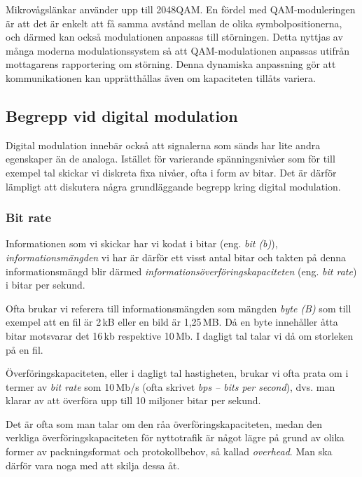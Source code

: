 Mikrovågslänkar använder upp till 2048QAM. En fördel med
QAM-moduleringen är att det är enkelt att få samma avstånd mellan de
olika symbolpositionerna, och därmed kan också modulationen anpassas
till störningen. Detta nyttjas av många moderna modulationssystem så
att QAM-modulationen anpassas utifrån mottagarens rapportering om
störning.  Denna dynamiska anpassning gör att kommunikationen kan
upprätthållas även om kapaciteten tillåts variera.

\subsection{Begrepp vid digital modulation}

Digital modulation innebär också att signalerna som sänds har lite
andra egenskaper än de analoga. Istället för varierande
spänningsnivåer som för till exempel tal skickar vi diskreta fixa
nivåer, ofta i form av bitar. Det är därför lämpligt att diskutera
några grundläggande begrepp kring digital modulation.


\subsubsection{Bit rate}

Informationen som vi skickar har vi kodat i bitar (eng. \emph{bit (b)}),
\emph{informationsmängden} vi har är därför ett visst antal bitar och takten på
denna informationsmängd blir därmed \emph{informationsöverföringskapaciteten}
(eng. \emph{bit rate}) i bitar per sekund.

Ofta brukar vi referera till informationsmängden som mängden \emph{byte (B)}
som till exempel att en fil är 2\,kB eller en bild är 1,25\,MB.
Då en byte innehåller åtta bitar motsvarar det 16\,kb respektive 10\,Mb.
I dagligt tal talar vi då om storleken på en fil.

Överföringskapaciteten, eller i dagligt tal hastigheten, brukar vi ofta prata
om i termer av \emph{bit rate} som 10\,Mb/s (ofta skrivet \emph{bps -- bits per
second}), dvs. man klarar av att överföra upp till 10 miljoner bitar per sekund.

Det är ofta som man talar om den råa överföringskapaciteten, medan den
verkliga överföringskapaciteten för nyttotrafik är något lägre på grund av
olika former av packningsformat och protokollbehov, så kallad \emph{overhead}.
Man ska därför vara noga med att skilja dessa åt.

